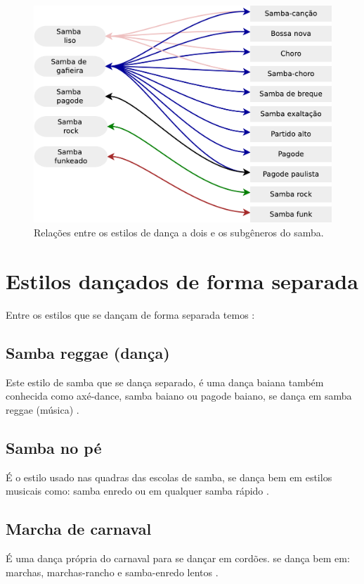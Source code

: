 \begin{figure}[h]
  \centering
    \includegraphics[width=1.0\textwidth]{chapters/cap-historia-dancasamba/dancavcmusica.eps}
  \caption{Relações entre os estilos de dança a dois e os subgêneros do samba.}
\label{fig:sambadavavsmusica}
\end{figure}

\section{Estilos dançados de forma separada}
Entre os estilos que se dançam de forma separada temos \cite[pp. 134]{perna2002samba}:

\subsection{Samba reggae  (dança)} 
Este estilo de samba que se dança separado, 
é uma dança baiana também conhecida como axé-dance, samba baiano ou pagode baiano,
se dança em samba reggae (música) \cite[pp. 134]{perna2002samba}.

\subsection{Samba no pé} 
É o estilo usado nas quadras das escolas de samba,
se dança bem em estilos musicais como: 
samba enredo ou em qualquer samba rápido  \cite[pp. 134]{perna2002samba}.

\subsection{Marcha de carnaval}
 É uma dança própria do carnaval para se dançar em cordões.
se dança bem em: marchas, marchas-rancho e samba-enredo lentos  \cite[pp. 135]{perna2002samba}.


